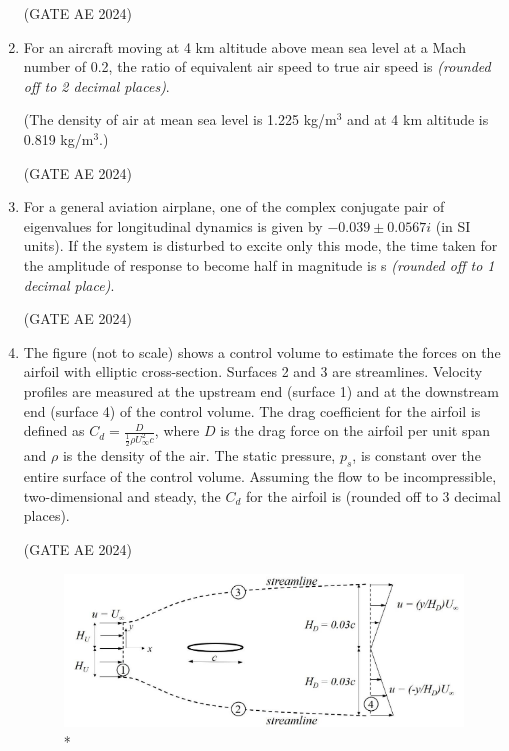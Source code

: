 \documentclass[journal,12pt,onecolumn]{IEEEtran}
\theoremstyle{remark}
\begin{document}
\begin{flushleft}
\begin{enumerate}
\hfill (GATE AE 2024)

\item For an aircraft moving at 4 km altitude above mean sea level at a Mach number of 0.2, the ratio of equivalent air speed to true air speed is \underline{\hspace{3cm}} \textit{(rounded off to 2 decimal places)}.  

(The density of air at mean sea level is 1.225 kg/m$^3$ and at 4 km altitude is 0.819 kg/m$^3$.)

\hfill (GATE AE 2024)

\item For a general aviation airplane, one of the complex conjugate pair of eigenvalues for longitudinal dynamics is given by $-0.039 \pm 0.0567 i$ (in SI units). If the system is disturbed to excite only this mode, the time taken for the amplitude of response to become half in magnitude is \underline{\hspace{3cm}} s \textit{(rounded off to 1 decimal place)}.

\hfill (GATE AE 2024)

\item The figure (not to scale) shows a control volume to estimate the forces on the airfoil with elliptic cross-section. Surfaces 2 and 3 are streamlines. Velocity profiles are measured at the upstream end (surface 1) and at the downstream end (surface 4) of the control volume. The drag coefficient for the airfoil is defined as
$C_d = \frac{D}{\frac12 \rho U_\infty^2 c}$,
where $D$ is the drag force on the airfoil per unit span and $\rho$ is the density of the air. The static pressure, $p_s$, is constant over the entire surface of the control volume. Assuming the flow to be incompressible, two-dimensional and steady, the $C_d$ for the airfoil is \underline{\hspace{3cm}} (rounded off to 3 decimal places). 

\hfill (GATE AE 2024)

\begin{figure}[H]
\includegraphics[width=0.8\columnwidth]{figs/63.png}
\caption{*}
    \label{fig:placeholder}
\end{figure}


\end{enumerate}
\end{flushleft}
\end{document}
